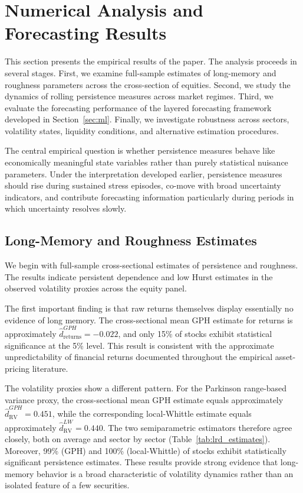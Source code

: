\documentclass[jrfm,article,submit,moreauthors,pdftex]{Definitions/mdpi}
\begin{document}
\section{Numerical Analysis and Forecasting Results}
\label{sec:results}

This section presents the empirical results of the paper. The analysis
proceeds in several stages. First, we examine full-sample estimates of
long-memory and roughness parameters across the cross-section of equities.
Second, we study the dynamics of rolling persistence measures across market
regimes. Third, we evaluate the forecasting performance of the layered
forecasting framework developed in Section~\ref{sec:ml}. Finally, we
investigate robustness across sectors, volatility states, liquidity
conditions, and alternative estimation procedures.

The central empirical question is whether persistence measures behave like
economically meaningful state variables rather than purely statistical
nuisance parameters. Under the interpretation developed earlier, persistence
measures should rise during sustained stress episodes, co-move with broad
uncertainty indicators, and contribute forecasting information particularly
during periods in which uncertainty resolves slowly.

\subsection{Long-Memory and Roughness Estimates}

We begin with full-sample cross-sectional estimates of persistence and
roughness. The results indicate persistent dependence and low Hurst estimates in
the observed volatility proxies across the equity panel.

The first important finding is that raw returns themselves display
essentially no evidence of long memory. The cross-sectional mean GPH
estimate for returns is approximately $ \hat{d}^{GPH}_{\mathrm{returns}}
= -0.022$, and only 15\% of stocks exhibit statistical significance at
the 5\% level. This result is consistent with the approximate
unpredictability of financial returns documented throughout the empirical
asset-pricing literature.

The volatility proxies show a different pattern.
For the Parkinson range-based variance proxy, the cross-sectional mean GPH
estimate equals approximately $ \hat{d}^{GPH}_{\mathrm{RV}} = 0.451$, while
the corresponding local-Whittle estimate equals approximately
$ \hat{d}^{LW}_{\mathrm{RV}} = 0.440$. The two semiparametric estimators
therefore agree closely, both on average and sector by sector
(Table~\ref{tab:lrd_estimates}). Moreover, 99\% (GPH) and 100\%
(local-Whittle) of stocks exhibit statistically significant persistence
estimates. These results provide strong evidence that
long-memory behavior is a broad characteristic of volatility dynamics
rather than an isolated feature of a few securities.
\end{document}
